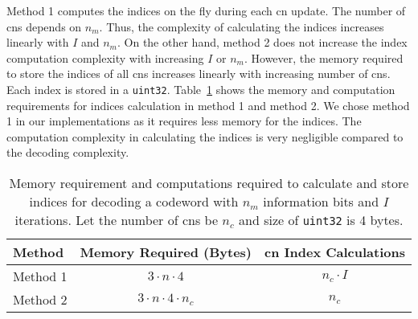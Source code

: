Method 1 computes the indices on the fly during each \gls{cn} update. The number of \glspl{cn} depends on $n_m$. Thus, the complexity of calculating the indices increases linearly with $I$ and $n_m$. On the other hand, method 2 does not increase the index computation complexity with increasing $I$ or $n_m$. However, the memory required to store the indices of all \glspl{cn} increases linearly with increasing number of \glspl{cn}. Each index is stored in a \texttt{uint32}. Table~\ref{tab:idx_com} shows the memory and computation requirements for indices calculation in method 1 and method 2. We chose method 1 in our implementations as it requires less memory for the indices. The computation complexity in calculating the indices is very negligible compared to the decoding complexity.
\begin{table}[htbp]
  \centering
  \begin{tabular}{|l|c|c|}
    \hline
    \textbf{Method} &\textbf{Memory Required (Bytes)} &\textbf{\gls{cn} Index Calculations}\\
    \hline
    \hline
    Method 1 &$3\cdot n\cdot 4$ &$n_c\cdot I$\\
    \hline
    Method 2 &$3\cdot n\cdot 4\cdot n_c$ &$n_c$\\
    \hline
  \end{tabular}
  \caption[Memory and complexity of different \acrshort{vn} indexing technieqes.]{Memory requirement and computations required to calculate and store indices for decoding a codeword with $n_m$ information bits and $I$ iterations. Let the number of \glspl{cn} be $n_c$ and size of \texttt{uint32} is 4 bytes.}
  \label{tab:idx_com}
\end{table}
 